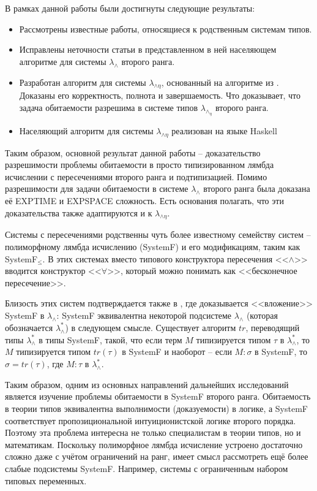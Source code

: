 \documentclass[../main.tex]{subfiles}
\begin{document}
В рамках данной работы были достигнуты следующие результаты: 

\begin{itemize}
    \item  Рассмотрены известные работы, относящиеся к родственным системам типов. 
    \item  Исправлены неточности статьи \cite{kusmierek_2007} в представленном в ней населяющем алгоритме для системы $\lambda_\wedge$ второго ранга. 
    \item  Разработан алгоритм для системы $\lambda_{\wedge \eta}$, основанный на алгоритме из \cite{kusmierek_2007}. Доказаны его корректность, полнота и завершаемость. Что доказывает, что задача обитаемости разрешима в системе типов $\lambda_\wedge_\eta$ второго ранга. 
    \item  Населяющий алгоритм для системы $\lambda_{\wedge \eta}$ реализован на языке Haskell \cite{kaysin_2019} 
\end{itemize}

Таким образом, основной результат данной работы -- доказательство разрешимости проблемы обитаемости в просто типизированном лямбда исчислении с пересечениями второго ранга и подтипизацией. Помимо разрешимости для задачи обитаемости в системе $\lambda_\wedge$ второго ранга была доказана её EXPTIME и EXPSPACE сложность. Есть основания полагать, что эти доказательства также адаптируются и к $\lambda_{\wedge \eta}$. 

\emptyline

Системы с пересечениями родственны чуть более известному семейству систем -- полиморфному лямбда исчислению (SystemF) и его модификациям, таким как SystemF$_\leqslant$. В этих системах вместо типового конструктора пересечения <<$\wedge$>> вводится конструктор <<$\forall$>>, который можно понимать как <<бесконечное пересечение>>. 

Близость этих систем подтверждается также в \cite{yokouchi_1995}, где доказывается <<вложение>> SystemF в $\lambda_\wedge$: SystemF эквивалентна некоторой подсистеме $\lambda_\wedge$ (которая обозначается $\lambda_\wedge^*$) в следующем смысле. Существует алгоритм $tr$, переводящий типы $\lambda_\wedge^*$ в типы SystemF, такой, что если терм $M$ типизируется типом $\tau$ в $\lambda_\wedge^*$, то $M$ типизируется типом $tr(\tau)$ в SystemF и наоборот -- если $M \colon \sigma$ в SystemF, то $\sigma = tr(\tau)$, где $M \colon \tau$ в $\lambda_\wedge^*$.

Таким образом, одним из основных направлений дальнейших исследований является изучение проблемы обитаемости в SystemF второго ранга. Обитаемость в теории типов эквивалентна выполнимости (доказуемости) в логике, а SystemF соответствует пропозициональной интуиционистской логике второго порядка. Поэтому эта проблема интересна не только специалистам в теории типов, но и математикам. Поскольку полиморфное лямбда исчисление устроено достаточно сложно даже с учётом ограничений на ранг, имеет смысл рассмотреть ещё более слабые подсистемы SystemF. Например, системы с ограниченным набором типовых переменных.
\end{document}
